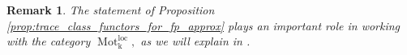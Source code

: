 \documentclass[11pt,leqno]{amsart}
\newtheorem{prop}[theo]{Proposition}
\newtheorem{remark}[theo]{Remark}
\numberwithin{equation}{section}
\def\Hom{\operatorname{Hom}}
\newcommand{\tens}[1]{%
  \mathbin{\mathop{\otimes}\displaylimits_{#1}}%
}
\newcommand{\hy}{\mhyphen}
\newcommand{\Mot}{\operatorname{Mot}}
\newcommand{\Cat}{\operatorname{Cat}}
\newcommand{\Cone}{\operatorname{Cone}}
\newcommand{\loc}{\operatorname{loc}}
\newcommand{\bE}{{\mathbb E}}
\newcommand{\mk}{\mathrm k}
\newcommand{\cB}{{\mathcal B}}
\newcommand{\THC}{\operatorname{THC}}
\newcommand{\Fun}{\operatorname{Fun}}
\newcommand{\Perf}{\operatorname{Perf}}
\newcommand{\perf}{\operatorname{perf}}
\newcommand{\Rep}{\operatorname{Rep}}
\newcommand{\Ind}{\operatorname{Ind}}
\newcommand{\Calk}{\operatorname{Calk}}
\newcommand{\Mod}{\operatorname{Mod}}
\begin{document}
\begin{remark}
The statement of Proposition \ref{prop:trace_class_functors_for_fp_approx} plays an important role in working with the category $\Mot_{\mk}^{\loc},$ as we will explain in \cite{E}.
\end{remark}





\end{document}
